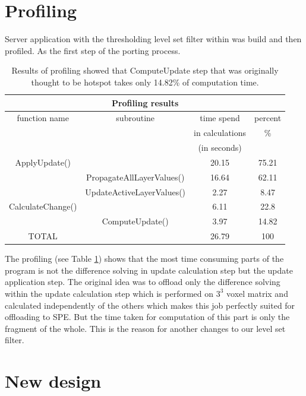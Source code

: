 \section{Profiling}

Server application with the thresholding level set filter within was build and then profiled. As the first step of the porting process.

\begin{table}
\centering
\begin{tabular}{|c|c|c|c|}
\hline
\multicolumn{4}{|c|}{Profiling results}\\
\hline
function name&subroutine&time spend&percent\\&&in calculations&\%\\&&(in seconds)&\\
\hline
\hline
ApplyUpdate()	&				&	20.15&	75.21\\
\hline
		&PropagateAllLayerValues()	&	16.64&	62.11\\
\hline
		&UpdateActiveLayerValues()	&	2.27&	8.47\\
\hline
CalculateChange()&				&	6.11&	22.8\\
\hline
		&ComputeUpdate()		&	3.97&	14.82\\
\hline
TOTAL		&				&	26.79&	100\\
\hline
\end{tabular}
\par
\caption[Profiling results]
{
  Results of profiling showed that ComputeUpdate step that was originally thought to be hotspot takes only 14.82\% of computation time.
}
\label{tab:profilingresults}
\end{table}

\par
The profiling (see Table \ref{tab:profilingresults}) shows that the most time consuming parts of the program is not the difference solving in update calculation step but the update application step.
The original idea was to offload only the difference solving within the update calculation step which is performed on $3^3$ voxel matrix and calculated independently of the others which makes this job perfectly suited for offloading to SPE.
But the time taken for computation of this part is only the fragment of the whole.
This is the reason for another changes to our level set filter.

\section{New design}

